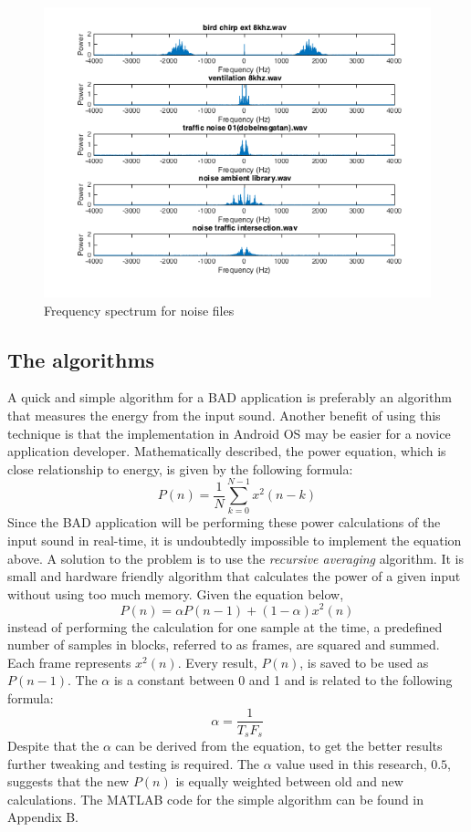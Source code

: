 \begin{figure}[H]
  \centering
  \includegraphics[width=1\textwidth]{sections/freq_spec_noise_2.png}
  \caption{Frequency spectrum for noise files}
  \label{fig:noise_spec}
\end{figure}

\subsection{The algorithms}
A quick and simple algorithm for a BAD application is preferably an algorithm
that measures the energy from the input sound. Another benefit of using this
technique is that the implementation in Android OS may be easier for a novice
application developer.  Mathematically described, the power equation, which is
close relationship to energy, is given by the following formula: 
\[
P(n) = \frac{1}{N} \sum\limits_{k=0}^{N-1} x^2(n-k)
\]
Since the BAD application will be performing these power calculations of the
input sound in real-time, it is undoubtedly impossible to implement the
equation above. A solution to the problem is to use the \emph{recursive
averaging} algorithm. It is small and hardware friendly algorithm that
calculates the power of a given input without using too much memory.
Given the equation below,
\[
P(n) = \alpha P(n-1)+(1-\alpha)x^2(n)
\]
instead of performing the calculation for one sample at the time, a predefined
number of samples in blocks, referred to as frames, are squared and summed.
Each frame represents $x^2(n)$. Every result, $P(n)$, is saved to be used as
$P(n-1)$.  The $\alpha$ is a constant between 0 and 1 and is related to the
following formula:
\[
\alpha = \frac{1}{T_{s}F_{s}}
\]
Despite that the $\alpha$ can be derived from the equation, to get the better
results further tweaking and testing is required.  The $\alpha$ value used in
this research, $0.5$, suggests that the new $P(n)$ is equally weighted between
old and new calculations.  The MATLAB code for the simple algorithm can be
found in Appendix B.

